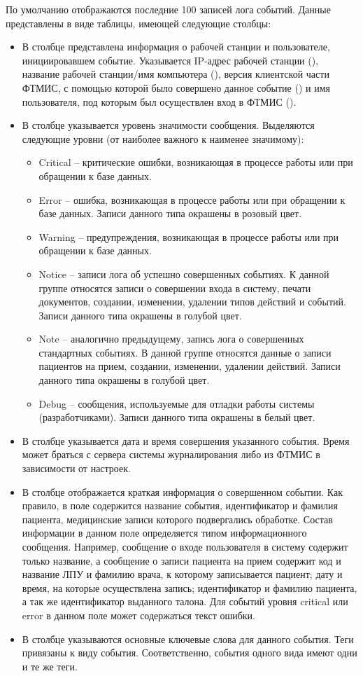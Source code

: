 По умолчанию отображаются последние 100 записей лога событий. Данные представлены в виде таблицы, имеющей следующие столбцы:
\begin{itemize}
 \item В столбце  представлена информация о рабочей станции и пользователе, инициировавшем событие. Указывается IP-адрес рабочей станции (), название рабочей станции/имя компьютера (), версия клиентской части ФТМИС, с помощью которой было совершено данное событие () и имя пользователя, под которым был осуществлен вход в ФТМИС ().
 \item В столбце  указывается уровень значимости сообщения. Выделяются следующие уровни (от наиболее важного к наименее значимому):
 \begin{itemize}
  \item Critical – критические ошибки, возникающая в процессе работы или при обращении к базе данных.
  \item Error – ошибка, возникающая в процессе работы или при обращении к базе данных. Записи данного типа окрашены в розовый цвет.
  \item Warning – предупреждения, возникающая в процессе работы или при обращении к базе данных.
  \item Notice – записи лога об успешно совершенных событиях. К данной группе относятся записи о совершении входа в систему, печати документов, создании, изменении, удалении типов действий и событий. Записи данного типа окрашены в голубой цвет.
  \item Note – аналогично предыдущему, запись лога о совершенных стандартных событиях. В данной группе относятся данные о записи пациентов на прием, создании, изменении, удалении действий. Записи данного типа окрашены в голубой цвет.
  \item Debug – сообщения, используемые для отладки работы системы (разработчиками). Записи данного типа окрашены в белый цвет.
 \end{itemize}
 \item В столбце  указывается дата и время совершения указанного события. Время может браться с сервера системы журналирования либо из ФТМИС в зависимости от настроек.
 \item В столбце  отображается краткая информация о совершенном событии. Как правило, в поле содержится название события, идентификатор и фамилия пациента, медицинские записи которого подвергались обработке. Состав информации в данном поле определяется типом информационного сообщения. Например, сообщение о входе пользователя в систему содержит только название, а сообщение о записи пациента на прием содержит код и название ЛПУ и фамилию врача, к которому записывается пациент; дату и время, на которые осуществлена запись; идентификатор и фамилию пациента, а так же идентификатор выданного талона. Для событий уровня critical или error в данном поле может содержаться текст ошибки.
 \item В столбце  указываются основные ключевые слова для данного события. Теги привязаны к виду события. Соответственно, события одного вида имеют одни и те же теги.
\end{itemize}
 
